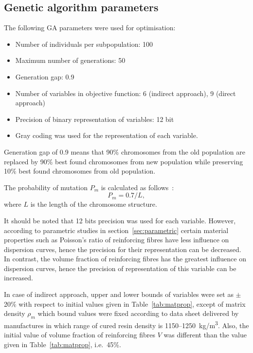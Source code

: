\documentclass[preprint,12pt]{elsarticle}
\begin{document}
	\subsection{Genetic algorithm parameters}
	The following GA parameters were used for optimisation:
	\begin{itemize}
		\item Number of individuals per subpopulation: 100
		\item Maximum number of generations: 50
		\item Generation gap: 0.9
		\item Number of variables in objective function: 6 (indirect approach), 9 (direct 
		approach)
		\item Precision of binary representation of variables: 12 bit
		\item Gray coding was used for the representation of each variable.
   \end{itemize}
    Generation gap of 0.9 means that 90\% chromosomes from the old population are 
    replaced by 90\% 
best found chromosomes from new population while preserving 10\% best found 
chromosomes from old 
population.
    
    The probability of mutation \(P_m\) is calculated as follows~\cite{Chipperfield1994}:
    \begin{equation}
    	P_m = 0.7/L,
    \end{equation}
    where \(L\) is the length of the chromosome structure.
    
    It should be noted that 12 bits precision was used for each variable. However, 
    according to parametric 
studies in section~\ref{sec:parametric} certain material properties such as Poisson's 
ratio of reinforcing 
fibres have less influence on dispersion curves, hence the precision for their 
representation can be 
decreased. In contrast, the volume fraction of reinforcing fibres has the greatest 
influence on dispersion 
curves, hence the precision of representation of this variable can be increased.
  
	In case of indirect approach, upper and lower bounds of variables were set as 
	\(\pm\)20\% with respect to initial values given in Table~\ref{tab:matprop}, except of 
	matrix density \(\rho_m\) which bound values were fixed according to data sheet 
	delivered by manufactures in which range of cured resin density is 
	1150--1250~kg/m\textsuperscript{3}. Also, the initial value of volume fraction of 
	reinforcing fibres \(V\) was different than the value given in Table~\ref{tab:matprop},  
	i.e.~45\%.
	
\end{document}
